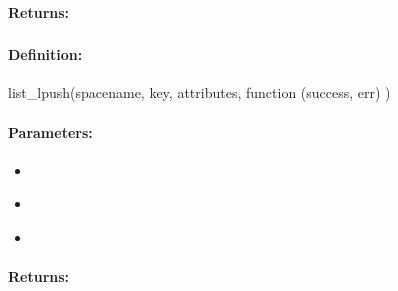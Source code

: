 \paragraph{Returns:}


\pagebreak
\subsubsection{}
\label{api:nodejs:list_lpush}


\paragraph{Definition:}
\begin{javascriptcode}
list_lpush(spacename, key, attributes, function (success, err) {})
\end{javascriptcode}
\paragraph{Parameters:}
\begin{itemize}[noitemsep]
\item {}\\

\item {}\\

\item {}\\

\end{itemize}

\paragraph{Returns:}


\pagebreak
\subsubsection{}
\label{api:nodejs:cond_list_lpush}


